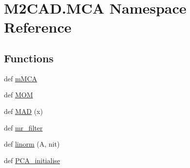 \hypertarget{namespace_m2_c_a_d_1_1_m_c_a}{}\section{M2\+C\+A\+D.\+M\+C\+A Namespace Reference}
\label{namespace_m2_c_a_d_1_1_m_c_a}
\subsection*{Functions}
\begin{DoxyCompactItemize}
\item 
def \hyperlink{namespace_m2_c_a_d_1_1_m_c_a_a70cf3f2d05b496e8b8d38a347f264f3b}{m\+M\+C\+A}
\item 
def \hyperlink{namespace_m2_c_a_d_1_1_m_c_a_af1254da44bc945707bb434f75729153b}{M\+O\+M}
\item 
def \hyperlink{namespace_m2_c_a_d_1_1_m_c_a_afaeada192d060b003600f552e2af3c7c}{M\+A\+D} (x)
\item 
def \hyperlink{namespace_m2_c_a_d_1_1_m_c_a_a1ee3f1fb24ae77e4c1e0dd63bfaf6055}{mr\+\_\+filter}
\item 
def \hyperlink{namespace_m2_c_a_d_1_1_m_c_a_a9ada413dc4be9b3c6082df4ecf8379d1}{linorm} (A, nit)
\item 
def \hyperlink{namespace_m2_c_a_d_1_1_m_c_a_a0f9be8aba58fe7d82c24e7a6d45994d4}{P\+C\+A\+\_\+initialise}
\end{DoxyCompactItemize}
